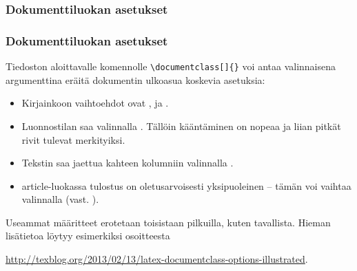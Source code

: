 \subsubsection{Dokumenttiluokan asetukset}
\begin{frame}[fragile]
    \frametitle{Dokumenttiluokan asetukset}
    Tiedoston aloittavalle komennolle \lstinline-\documentclass[]{}- voi antaa valinnaisena argumenttina eräitä dokumentin ulkoasua koskevia asetuksia:
    \begin{itemize}
        \item Kirjainkoon vaihtoehdot ovat \cns{10pt}, \cns{11pt} ja \cns{12pt}. 
        \item Luonnostilan saa valinnalla . Tällöin kääntäminen on nopeaa ja liian pitkät rivit tulevat merkityiksi.
        \item Tekstin saa jaettua kahteen kolumniin valinnalla . 
        \item article-luokassa tulostus on oletusarvoisesti yksipuoleinen -- tämän voi vaihtaa valinnalla  (vast. ).
    \end{itemize}
    Useammat määritteet erotetaan toisistaan pilkuilla, kuten tavallista.
    \vaihto
    Hieman lisätietoa löytyy esimerkiksi osoitteesta \begin{scriptsize}
        \url{http://texblog.org/2013/02/13/latex-documentclass-options-illustrated}.
    \end{scriptsize}
\end{frame}
%


